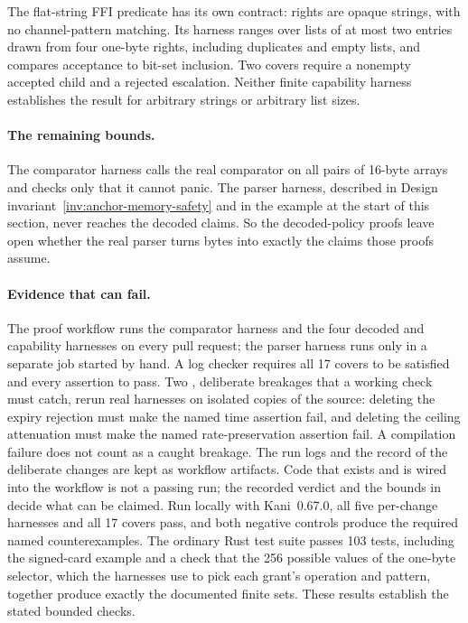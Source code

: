 \documentclass[11pt,a4paper]{article}
\theoremstyle{definition}
\begin{document}
The flat-string FFI predicate has its own contract: rights are opaque
strings, with no channel-pattern matching. Its harness ranges over lists of at most
two entries drawn from four one-byte rights, including duplicates and empty
lists, and compares acceptance to bit-set inclusion. Two covers require a
nonempty accepted child and a rejected escalation. Neither finite capability
harness establishes the result for arbitrary strings or arbitrary list sizes.

\paragraph{The remaining bounds.}
The comparator harness calls the real comparator on all pairs of 16-byte
arrays and checks only that it cannot panic. The parser harness, described in
Design invariant~\ref{inv:anchor-memory-safety} and in the example at the start
of this section, never reaches the decoded claims. So the decoded-policy
proofs leave open whether the real parser turns bytes into exactly the claims
those proofs assume.

\paragraph{Evidence that can fail.}
The proof workflow runs the comparator harness and the four decoded and
capability harnesses on every pull request; the parser harness runs only in a
separate job started by hand. A log checker requires all 17 covers to be
satisfied and every assertion to pass. Two ,
deliberate breakages that a working check must catch, rerun real harnesses on
isolated copies of the source: deleting the expiry rejection must make the
named time assertion fail, and deleting the ceiling attenuation must make the
named rate-preservation assertion fail. A compilation failure does not count
as a caught breakage. The run logs and the record of the deliberate changes
are kept as workflow artifacts. Code that exists and is wired into the
workflow is not a passing run; the recorded verdict and the bounds in
 decide what can be claimed. Run locally with
Kani~0.67.0, all five per-change harnesses and all 17 covers pass, and both
negative controls produce the required named counterexamples. The ordinary
Rust test suite passes 103 tests, including the signed-card example and a
check that the 256 possible values of the one-byte selector, which the
harnesses use to pick each grant's operation and pattern, together produce
exactly the documented finite sets. These results establish the stated bounded
checks.
\end{document}
